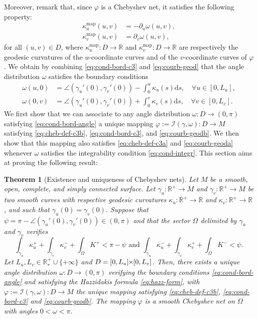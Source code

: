 \documentclass{article}
\newcommand{\I}{\mathcal{I}}
\newcommand{\PLH}{{\mkern-1mu\times\mkern-1mu}}
\newcommand{\Times}{\PLH}
\newcommand{\R}{\mathbb{R}}
\newcommand{\surf}{M}
\newcommand{\ko}{\kappa}
\newcommand{\kop}{\kappa^{\mathrm{map}}}
\newcommand{\ds}{\mathrm{d}s}
\newtheorem{theorem}{Theorem}
\theoremstyle{remark}
\theoremstyle{prpart}
\begin{document}
Moreover, remark that, since $\varphi$ is a Chebyshev net, it satisfies the following property:
\begin{subequations}\label{eq:courb-geod}
\begin{align}\label{eq:courb-geoda}
\kop_u(u,v) &= -\partial_u\omega(u,v), \\\label{eq:courb-geodb}
\kop_v(u,v) &= \partial_v\omega(u,v),
\end{align}
\end{subequations}
for all $(u,v)\in D$, where $\kop_u:D\to\R$ and $\kop_v:D\to\R$ are respectively the geodesic curvatures of the $u$-coordinate curves and of the $v$-coordinate curves of $\varphi$. We obtain by combining \eqref{eq:cond-bord-c3} and \eqref{eq:courb-geod} that the angle distribution $\omega$ satisfies the boundary conditions
\begin{subequations}\label{eq:cond-bord-angle}
\begin{align}
\omega(u, 0) &= \angle(\gamma_u'(0), \gamma_v'(0)) - \int_0^u\ko_u(s)\ds,\quad\forall u\in[0,L_u],\\
\omega(0,v) &= \angle(\gamma_u'(0), \gamma_v'(0)) + \int_0^v\ko_v(s)\ds,\quad\forall v\in[0,L_v].
\end{align}
\end{subequations}
We first show that we can associate to any angle distribution
$\omega:D\to(0,\pi)$ satisfying \eqref{eq:cond-bord-angle} a unique
mapping $\varphi:=\I(\gamma,\omega):D\to\surf$ satisfying
\eqref{eq:cheb-def-c3b}, \eqref{eq:cond-bord-c3}, and
\eqref{eq:courb-geodb}. We then show that this mapping also satisfies
\eqref{eq:cheb-def-c3a} and \eqref{eq:courb-geoda} whenever $\omega$
satisfies the integrability condition \eqref{eq:cond-integr}. This
section aims at proving the following result:
\begin{theorem}[Existence and uniqueness of Chebyshev nets]\label{thm2full}
Let $\surf$ be a smooth, open, complete, and simply connected
surface. Let $\gamma_u:\R^+\to\surf$ and $\gamma_v:\R^+\to\surf$ be
two smooth curves with respective geodesic curvatures $\ko_u:\R^+\to\R$ and
$\ko_v:\R^+\to\R$, and such that $\gamma_u(0) = \gamma_v(0)$. Suppose
that $\psi=\pi-\angle(\gamma_u'(0),\gamma_v'(0))\in(0,\pi)$ and that
the sector $\Omega$ delimited by $\gamma_u$ and $\gamma_v$
verifies \[\int_{\gamma_u}{\ko_u^+} + \int_{\gamma_v}{\ko_v^-} +
\int_{\Omega}{K^+}<\pi-\psi \text{ and } \int_{\gamma_u}{\ko_u^-} +
\int_{\gamma_v}{\ko_v^+} + \int_{\Omega}{K^-}<\psi.\] Let
$L_u,L_v\in\R_\ast^+\cup\{+\infty\}$ and $D=[0,L_u]\Times[0,L_v]$. Then, there exists
a unique angle distribution $\omega:D\to(0,\pi)$ verifying the
boundary conditions \eqref{eq:cond-bord-angle} and satisfying the
Hazzidakis formula \eqref{eq:hazz-form}, with
$\varphi:=\I(\gamma,\omega): D\to\surf$ the unique mapping satisfying
\eqref{eq:cheb-def-c3b}, \eqref{eq:cond-bord-c3} and
\eqref{eq:courb-geodb}. The mapping $\varphi$ is a smooth Chebyshev net on
$\Omega$ with angles $0<\omega<\pi$.
\end{theorem}
\end{document}
